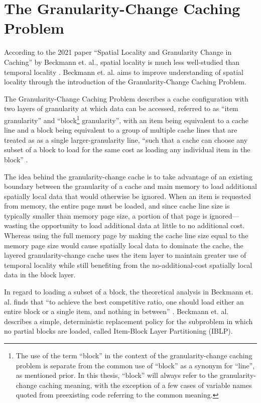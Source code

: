 \documentclass[12pt,twoside]{reedthesis}
\begin{document}
\section{The Granularity-Change Caching Problem}

According to the 2021 paper ``Spatial Locality and Granularity Change in Caching'' by Beckmann et. al., spatial locality is much less well-studied than temporal locality  \cite{beckmann}. Beckmann et. al. aims to improve understanding of spatial locality through the introduction of the Granularity-Change Caching Problem.

The Granularity-Change Caching Problem describes a cache configuration with two layers of granularity at which data can be accessed, referred to as ``item granularity'' and ``block\footnote{The use of the term ``block'' in the context of the granularity-change caching problem is separate from the common use of ``block'' as a synonym for ``line'', as mentioned prior. In this thesis, ``block'' will always refer to the granularity-change caching meaning, with the exception of a few cases of variable names quoted from preexisting code referring to the common meaning.} granularity'', with an item being equivalent to a cache line and a block being equivalent to a group of multiple cache lines that are treated as as a single larger-granularity line, ``such that a cache can choose any subset of a block to load for the same cost as loading any individual item in the block'' \cite{beckmann}.

The idea behind the granularity-change cache is to take advantage of an existing boundary between the granularity of a cache and main memory to load additional spatially local data that would otherwise be ignored. When an item is requested from memory, the entire page must be loaded, and since cache line size is typically smaller than memory page size, a portion of that page is ignored---wasting the opportunity to load additional data at little to no additional cost. Whereas using the full memory page by making the cache line size equal to the memory page size would cause spatially local data to dominate the cache, the layered granularity-change cache uses the item layer to maintain greater use of temporal locality while still benefiting from the no-additional-cost spatially local data in the block layer.

In regard to loading a subset of a block, the theoretical analysis in Beckmann et. al. finds that ``to achieve the best competitive ratio, one should load either an entire block or a single item, and nothing in between'' \cite{beckmann}. Beckmann et. al. describes a simple, deterministic replacement policy for the subproblem in which no partial blocks are loaded, called Item-Block Layer Partitioning (IBLP).
\end{document}
